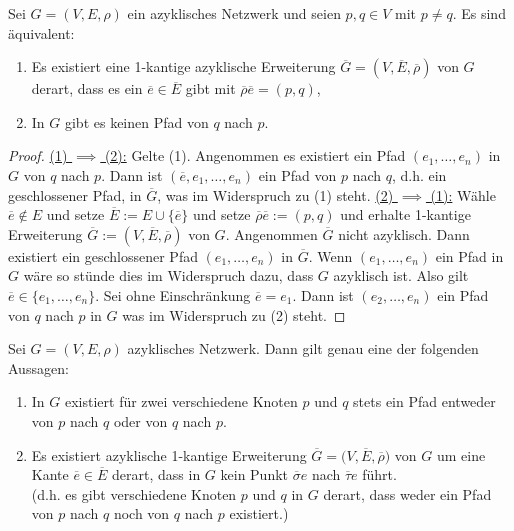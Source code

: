 \begin{lemma}
    Sei $G=(V,E,\rho)$ ein azyklisches Netzwerk und seien $p,q \in V$ mit $p \ne q$.
    Es sind äquivalent:
    \begin{enumerate}[label=(\arabic*)]
        \item Es existiert eine 1-kantige azyklische Erweiterung $\overline{G} = (V,\overline{E}, \overline{\rho})$ von $G$
        derart, dass es ein $\overline{e} \in \overline{E}$ gibt mit $\overline{\rho}\overline{e} = (p,q)$,

        \item  In $G$ gibt es keinen Pfad von $q$ nach $p$.
    \end{enumerate}
\end{lemma}
\begin{proof}
    \underline{(1) $\implies$ (2):} Gelte (1). Angenommen es existiert ein Pfad $(e_1, \ldots,e_n)$ in $G$ von $q$ nach $p$. Dann ist
    $(\overline{e},e_1,\ldots,e_n)$ ein Pfad von $p$ nach $q$, d.h. ein geschlossener Pfad, in $\overline{G}$, was im Widerspruch zu (1) steht.\nl
    \underline{(2) $\implies$ (1):} Wähle $\overline{e} \notin E$ und setze $\overline{E} := E \cup \{\overline{e}\}$ und setze
    $\overline{\rho}\overline{e}:=(p,q)$ und erhalte 1-kantige Erweiterung $\overline{G} := (V, \overline{E}, \overline{\rho})$
    von $G$. Angenommen $\overline{G}$ nicht azyklisch. Dann existiert ein geschlossener Pfad $(e_1, \ldots,e_n)$ in $\overline{G}$.
    Wenn $(e_1, \ldots,e_n)$ ein Pfad in $G$ wäre so stünde dies im Widerspruch dazu, dass $G$ azyklisch ist.
    Also gilt $\overline{e} \in \{e_1, \ldots,e_n\}$. Sei ohne Einschränkung $\overline{e} = e_1$. Dann ist $(e_2, \ldots, e_n)$ ein
    Pfad von $q$ nach $p$ in $G$ was im Widerspruch zu (2) steht.
\end{proof}

\begin{lemma}\label{lemmaAnwendung}
Sei $G=(V,E,\rho)$ azyklisches Netzwerk. Dann gilt genau eine der folgenden Aussagen:
	\begin{enumerate}[label=(\roman*)]
		\item In $G$ existiert für zwei verschiedene Knoten $p$ und $q$ stets ein Pfad entweder von $p$ nach $q$ oder von $q$ nach $p$.
		\item Es existiert azyklische 1-kantige Erweiterung $\overline{G}=\big(V,\overline{E},\overline{\rho}\big)$ von $G$ um eine Kante $\overline{e}\in\overline{E}$ derart, dass in  $G$ kein Punkt $\overline{\sigma}e$ nach $\overline{\tau}e$ führt.\\
		(d.h. es gibt verschiedene Knoten $p$ und $q$ in $G$ derart, dass weder ein Pfad von $p$ nach $q$ noch von $q$ nach $p$ existiert.)
	\end{enumerate}
\end{lemma}

